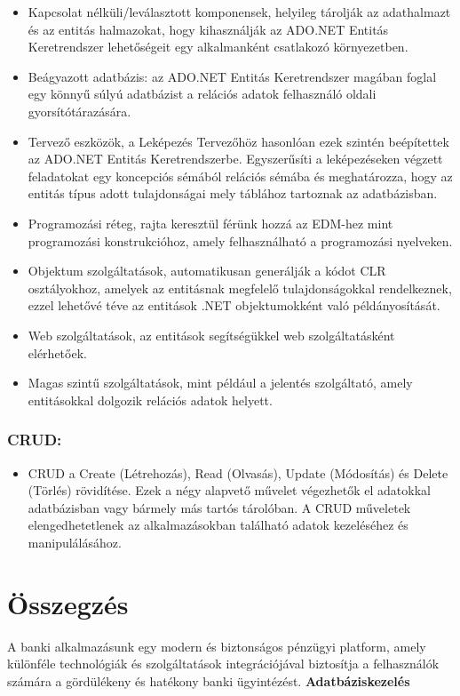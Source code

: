 \documentclass[colorlinks]{thesis-kando}
\theoremstyle{definition}
\theoremstyle{remark}
\begin{document}
\begin{itemize}
   \item Kapcsolat nélküli/leválasztott komponensek, helyileg tárolják az adathalmazt és az entitás halmazokat, hogy kihasználják az ADO.NET Entitás Keretrendszer lehetőségeit egy alkalmanként csatlakozó környezetben.
   \item Beágyazott adatbázis: az ADO.NET Entitás Keretrendszer magában foglal egy könnyű súlyú adatbázist a relációs adatok felhasználó oldali gyorsítótárazására.

    \item   Tervező eszközök, a Leképezés Tervezőhöz hasonlóan ezek szintén beépítettek az ADO.NET Entitás Keretrendszerbe. Egyszerűsíti a leképezéseken végzett feladatokat egy koncepciós sémából relációs sémába és meghatározza, hogy az entitás típus adott tulajdonságai mely táblához tartoznak az adatbázisban.
    \item Programozási réteg, rajta keresztül férünk hozzá az EDM-hez mint programozási konstrukcióhoz, amely felhasználható a programozási nyelveken.

     \item  Objektum szolgáltatások, automatikusan generálják a kódot CLR osztályokhoz, amelyek az entitásnak megfelelő tulajdonságokkal rendelkeznek, ezzel lehetővé téve az entitások .NET objektumokként való példányosítását.

     \item   Web szolgáltatások, az entitások segítségükkel web szolgáltatásként elérhetőek.
     \item Magas szintű szolgáltatások, mint például a jelentés szolgáltató, amely entitásokkal dolgozik relációs adatok helyett.
    
    \end{itemize}
    \subsection{CRUD:}
    \begin{itemize}
        \item CRUD a Create (Létrehozás), Read (Olvasás), Update (Módosítás) és Delete (Törlés) rövidítése. Ezek a négy alapvető művelet végezhetők el adatokkal adatbázisban vagy bármely más tartós tárolóban. A CRUD műveletek elengedhetetlenek az alkalmazásokban található adatok kezeléséhez és manipulálásához.
     
    \end{itemize}

\chapter*{Összegzés}
A banki alkalmazásunk egy modern és biztonságos pénzügyi platform, amely különféle technológiák és szolgáltatások integrációjával biztosítja a felhasználók számára a gördülékeny és hatékony banki ügyintézést.
\newline\newline
\textbf{Adatbáziskezelés}
\end{document}
